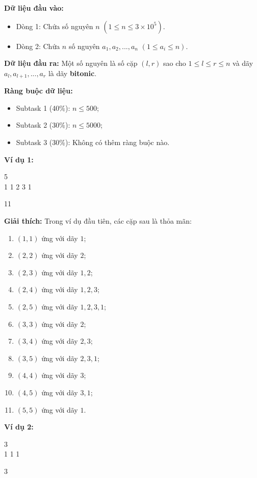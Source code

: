 \documentclass[12pt]{scrartcl}  %
\begin{document}
\textbf{Dữ liệu đầu vào:}
\begin{itemize}
    \item Dòng 1: Chứa số nguyên $n$ $(1 \leq n \leq 3 \times 10^5)$.
    \item Dòng 2: Chứa $n$ số nguyên $a_1, a_2, ..., a_n$ $(1 \leq a_i \leq n)$.
\end{itemize}

\textbf{Dữ liệu đầu ra:}
Một số nguyên là số cặp $(l, r)$ sao cho $1 \leq l \leq r \leq n$ và dãy $a_l, a_{l + 1}, ..., a_r$ là dãy \textbf{bitonic}.

\textbf{Ràng buộc dữ liệu:}
\begin{itemize}
    \item Subtask 1 (40\%): $n \leq 500$;
    \item Subtask 2 (30\%): $n \leq 5000$;
    \item Subtask 3 (30\%): Không có thêm ràng buộc nào.
\end{itemize}

\textbf{Ví dụ 1:}
\begin{tcolorbox}[colback=gray!5!white, colframe=blue!50!black, title=Input]
5\\
1 1 2 3 1
\end{tcolorbox}
\begin{tcolorbox}[colback=gray!5!white, colframe=green!50!black, title=Output]
11
\end{tcolorbox}

\textbf{Giải thích:}
Trong ví dụ đầu tiên, các cặp sau là thỏa mãn:

\begin{enumerate}
\item $(1, 1)$ ứng với dãy $1$;
\item $(2, 2)$ ứng với dãy $2$;
\item $(2, 3)$ ứng với dãy $1, 2$;
\item $(2, 4)$ ứng với dãy $1, 2, 3$;
\item $(2, 5)$ ứng với dãy $1, 2, 3, 1$;
\item $(3, 3)$ ứng với dãy $2$;
\item $(3, 4)$ ứng với dãy $2, 3$;
\item $(3, 5)$ ứng với dãy $2, 3, 1$;
\item $(4, 4)$ ứng với dãy $3$;
\item $(4, 5)$ ứng với dãy $3, 1$;
\item $(5, 5)$ ứng với dãy $1$.
\end{enumerate}

\textbf{Ví dụ 2:}
\begin{tcolorbox}[colback=gray!5!white, colframe=blue!50!black, title=Input]
3\\
1 1 1
\end{tcolorbox}
\begin{tcolorbox}[colback=gray!5!white, colframe=green!50!black, title=Output]
3
\end{tcolorbox}
\end{document}
